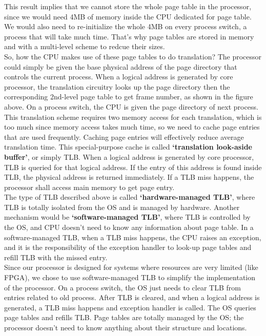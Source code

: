 \documentclass[oneside]{book}
\begin{document}
This result implies that we cannot store the whole page table
in the processor, since we would need 4MB of memory inside
the CPU dedicated for page table. We would also need
to re-initialize the whole 4MB on every process switch, a process
that will take much time. That's why page tables are stored
in memory and with a multi-level scheme to redcue their sizes.\\

So, how the CPU makes use of these page tables to do translation?
The processor could simply be given the base physical address
of the page directory that controls the current process. When
a logical address is generated by core processor, the translation
circuitry looks up the page directory then the corresponding 2nd-level
page table to get frame number, as shown in the figure above.
On a process switch, the CPU is given the page directory of
next process.\\

This translation scheme requires two memory access for each translation,
which is too much since memory access takes much time, so we need
to cache page entries that are used frequently. Caching page
entries will effectively reduce average translation time.
This special-purpose cache is called \textbf{`translation
look-aside buffer'}, or simply TLB. When a logical address is generated
by core processor, TLB is queried for that logical address. If
the entry of this address is found inside TLB, the physical
address is returned immediately. If a TLB miss happens, the processor
shall access main memory to get page entry.\\

The type of TLB described above is called \textbf{`hardware-managed TLB'},
where TLB is totally isolated from the OS and is managed by
hardware. Another mechanism would be \textbf{`software-managed TLB'},
where TLB is controlled by the OS, and CPU doesn't need
to know any information about page table. In a software-managed TLB,
when a TLB miss happens, the CPU raises an exception, and it is
the responsibility of the exception handler to look-up page
tables and refill TLB with the missed entry.\\

Since our processor is designed for systems where resources
are very limited (like FPGA), we chose to use software-managed
TLB to simplify the implementation of the processor. On a process
switch, the OS just needs to clear TLB from entries related
to old process. After TLB is cleared, and when a logical address
is generated, a TLB miss happens and exception handler is called.
The OS queries page tables and refills TLB. Page tables are
totally managed by the OS; the processor doesn't need
to know anything about their structure and locations. \\
\end{document}
